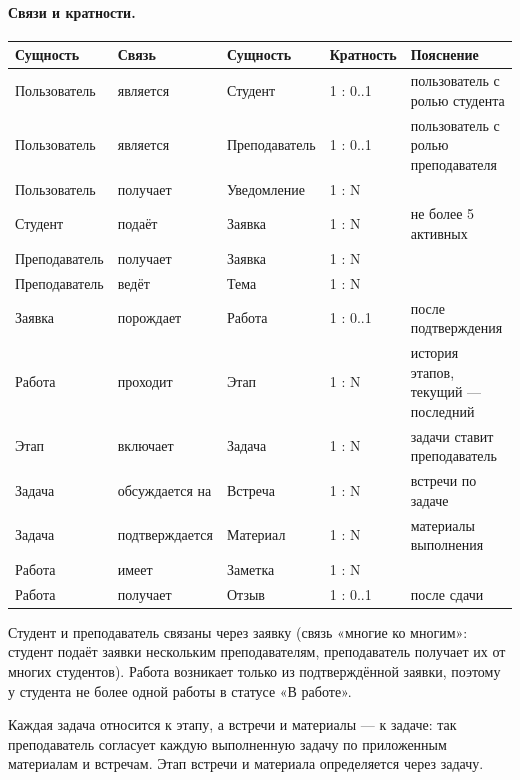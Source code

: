 \documentclass[a4paper,12pt]{article}
\begin{document}
\paragraph{Связи и кратности.}
\begin{center}
\small
\begin{longtable}{|p{3.2cm}|p{2.6cm}|p{3.2cm}|p{1.6cm}|p{3.4cm}|}
\hline
\textbf{Сущность} & \textbf{Связь} & \textbf{Сущность} & \textbf{Кратность} & \textbf{Пояснение}\\ \hline
\endhead
Пользователь & является & Студент & 1 : 0..1 & пользователь с ролью студента\\ \hline
Пользователь & является & Преподаватель & 1 : 0..1 & пользователь с ролью преподавателя\\ \hline
Пользователь & получает & Уведомление & 1 : N & \\ \hline
Студент & подаёт & Заявка & 1 : N & не более 5 активных\\ \hline
Преподаватель & получает & Заявка & 1 : N & \\ \hline
Преподаватель & ведёт & Тема & 1 : N & \\ \hline
Заявка & порождает & Работа & 1 : 0..1 & после подтверждения\\ \hline
Работа & проходит & Этап & 1 : N & история этапов, текущий — последний\\ \hline
Этап & включает & Задача & 1 : N & задачи ставит преподаватель\\ \hline
Задача & обсуждается на & Встреча & 1 : N & встречи по задаче\\ \hline
Задача & подтверждается & Материал & 1 : N & материалы выполнения\\ \hline
Работа & имеет & Заметка & 1 : N & \\ \hline
Работа & получает & Отзыв & 1 : 0..1 & после сдачи\\ \hline
\end{longtable}
\end{center}
Студент и преподаватель связаны через заявку (связь «многие ко многим»: студент подаёт заявки нескольким преподавателям, преподаватель получает их от многих студентов). Работа возникает только из подтверждённой заявки, поэтому у студента не более одной работы в статусе «В работе».

Каждая задача относится к этапу, а встречи и материалы — к задаче: так преподаватель согласует каждую выполненную задачу по приложенным материалам и встречам. Этап встречи и материала определяется через задачу.
\end{document}
